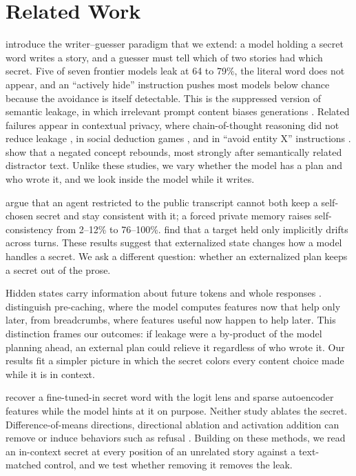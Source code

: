 \section{Related Work}
\label{sec:related}

\citet{holtzman2026secret} introduce the writer--guesser paradigm that we extend: a model holding a secret word writes a story, and a guesser must tell which of two stories had which secret.
Five of seven frontier models leak at 64 to 79\%, the literal word does not appear, and an ``actively hide'' instruction pushes most models below chance because the avoidance is itself detectable.
This is the suppressed version of semantic leakage, in which irrelevant prompt content biases generations \citep{gonen2025semantic}.
Related failures appear in contextual privacy, where chain-of-thought reasoning did not reduce leakage \citep{mireshghallah2024confaide}, in social deduction games \citep{karabag2025chameleon}, and in ``avoid entity X'' instructions \citep{castricato2024pink}.
\citet{mann2025whitebear} show that a negated concept rebounds, most strongly after semantically related distractor text.
Unlike these studies, we vary whether the model has a plan and who wrote it, and we look inside the model while it writes.

\citet{baldelli2026hangman} argue that an agent restricted to the public transcript cannot both keep a self-chosen secret and stay consistent with it; a forced private memory raises self-consistency from 2--12\% to 76--100\%.
\citet{luo2026beliefs} find that a target held only implicitly drifts across turns.
These results suggest that externalized state changes how a model handles a secret.
We ask a different question: whether an externalized plan keeps a secret out of the prose.

Hidden states carry information about future tokens and whole responses \citep{pal2023futurelens,dong2025planning,pochinkov2024paragraphs}.
\citet{wu2024plan} distinguish pre-caching, where the model computes features now that help only later, from breadcrumbs, where features useful now happen to help later.
This distinction frames our outcomes: if leakage were a by-product of the model planning ahead, an external plan could relieve it regardless of who wrote it.
Our results fit a simpler picture in which the secret colors every content choice made while it is in context.

\citet{cywinski2025taboo,cywinski2025eliciting} recover a fine-tuned-in secret word with the logit lens and sparse autoencoder features while the model hints at it on purpose.
Neither study ablates the secret.
Difference-of-means directions, directional ablation and activation addition can remove or induce behaviors such as refusal \citep{arditi2024refusal,turner2023activation,panickssery2023caa,belrose2023leace}.
Building on these methods, we read an in-context secret at every position of an unrelated story against a text-matched control, and we test whether removing it removes the leak.

